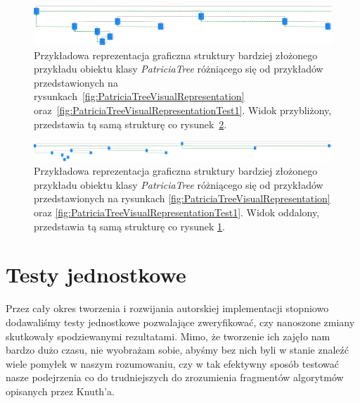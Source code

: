         \begin{figure}[htb]
    		\caption{Przykładowa reprezentacja graficzna struktury bardziej złożonego przykładu obiektu klasy \emph{PatriciaTree} różniącego się od przykładów przedstawionych na rysunkach~\ref{fig:PatriciaTreeVisualRepresentation} oraz~\ref{fig:PatriciaTreeVisualRepresentationTest1}. Widok przybliżony, przedstawia tą samą strukturę co rysunek~\ref{fig:PatriciaTreeVisualRepresentationTest3}.}\label{fig:PatriciaTreeVisualRepresentationTest2}
    		\centering
    		\includegraphics[width = \textwidth]{representationBigger-zoomedIn_compressed.png}
    	\end{figure}
    	
        \begin{figure}[htb]
    		\caption{Przykładowa reprezentacja graficzna struktury bardziej złożonego przykładu obiektu klasy \emph{PatriciaTree} różniącego się od przykładów przedstawionych na rysunkach \ref{fig:PatriciaTreeVisualRepresentation} oraz \ref{fig:PatriciaTreeVisualRepresentationTest1}. Widok oddalony, przedstawia tą samą strukturę co rysunek \ref{fig:PatriciaTreeVisualRepresentationTest2}.}\label{fig:PatriciaTreeVisualRepresentationTest3}
    		\centering
    		\includegraphics[width = \textwidth]{representationBigger-zoomedOut_compressed.png}
    	\end{figure}
		
		\section{Testy jednostkowe}\label{sec:czescPraktycznaRezultatyImplementacjiTestyJednostkowe}
		
    	Przez cały okres tworzenia i rozwijania autorskiej implementacji stopniowo dodawaliśmy testy jednostkowe pozwalające zweryfikować, czy nanoszone zmiany skutkowały spodziewanymi rezultatami. Mimo, że tworzenie ich zajęło nam bardzo dużo czasu, nie wyobrażam sobie, abyśmy bez nich byli w stanie znaleźć wiele pomyłek w naszym rozumowaniu, czy w tak efektywny sposób testować nasze podejrzenia co do trudniejszych do zrozumienia fragmentów algorytmów opisanych przez Knuth'a.
		
